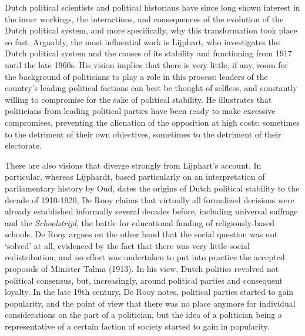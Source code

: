     Dutch political scientists and political historians have since long shown interest in the inner workings, the interactions, and consequences of the evolution of the Dutch political system, and more specifically, why this transformation took place so fast. Arguably, the most influential work is Lijphart, who investigates the Dutch political system and the causes of its stability and functioning from 1917 until the late 1960s.\autocite{lijphart1975politics} His vision implies that there is very little, if any, room for the background of politicians to play a role in this process: leaders of the country’s leading political factions can best be thought of selfless, and constantly willing to compromise for the sake of political stability. He illustrates that politicians from leading political parties have been ready to make excessive compromises, preventing the alienation of the opposition at high costs: sometimes to the detriment of their own objectives, sometimes to the detriment of their electorate. %

    There are also visions that diverge strongly from Lijphart's account. In particular, whereas Lijphardt, based particularly on an interpretation of parliamentary history by Oud, dates the origins of Dutch political stability to the decade of 1910-1920, De Rooy claims that virtually all formalized decisions were already established informally several decades before, including universal suffrage and the \textit{Schoolstrijd}, the battle for educational funding of religiously-based schools.\autocite{oud1961honderd} \autocite{rooy2014ons} De Rooy argues on the other hand that the social question was not ‘solved’ at all, evidenced by the fact that there was very little social redistribution, and no effort was undertaken to put into practice the accepted proposals of Minister Talma (1913). In his view, Dutch politics revolved not political consensus, but, increasingly, around political parties and consequent loyalty. In the late 19th century, De Rooy notes, political parties started to gain popularity, and the point of view that there was no place anymore for individual considerations on the part of a politician, but the idea of a politician being a representative of a certain faction of society started to gain in popularity. 
    
